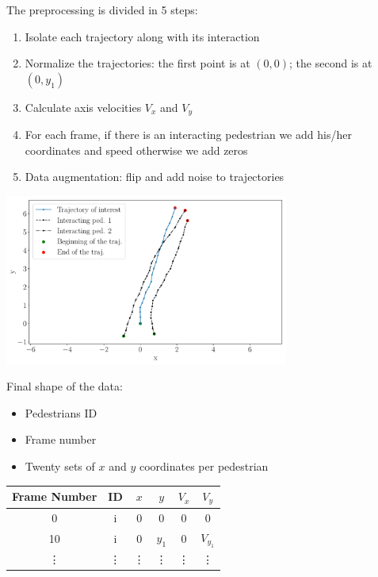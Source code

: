 \documentclass[a0,portrait]{a0poster}
\begin{document}
\begin{multicols}{2}
\begin{minipage}[]{0.5\linewidth}
The preprocessing is divided in 5 steps:
\begin{enumerate}
\item Isolate each trajectory along with its interaction
\item Normalize the trajectories: the first point is at $(0,0)$; the second is at $(0,y_1)$
\item Calculate axis velocities $V_x$ and $V_y$
\item For each frame, if there is an interacting pedestrian we add his/her coordinates and speed otherwise we add zeros
\item Data augmentation: flip and add noise to trajectories
\end{enumerate}
\end{minipage}
\hfill
\begin{minipage}[]{0.5\linewidth}
\begin{center}
\centerline {\includegraphics[width=0.7\textwidth]{figure/afterrot}} 
\end{center}
\end{minipage}

\vspace{1cm}

Final shape of the data:\\
\begin{minipage}[]{0.5\linewidth}
\begin{itemize}
\item Pedestrians ID
\item Frame number 
\item Twenty sets of $x$ and $y$ coordinates per pedestrian
\end{itemize}
\end{minipage}
\hfill
\begin{minipage}[]{0.5\linewidth}
\begin{center}
\begin{tabular}{|c|c|c|c|c|c|}
\hline
Frame Number & ID & $x$ & $y$ & $ V_x$ & $V_y$ \\ \hline
        0     &  i  &  0 &  0 &  0 &  0 \\ \hline
        10     &  i  &  0 &  $y_1$ &  0 &  $V_{y_1}$ \\ \hline
        \vdots     &  \vdots &  \vdots & \vdots &  \vdots &  \vdots \\ \hline
\end{tabular}
\end{center}
\end{minipage}


\end{multicols}
\end{document}

